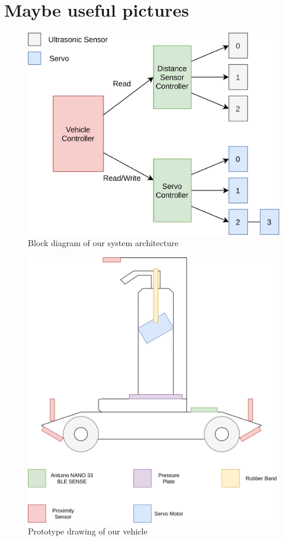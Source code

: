 \documentclass{article}
\begin{document}
\newpage
\section{Maybe useful pictures}


\begin{figure}[H]
	\centering
	\includegraphics[width=\linewidth]{system-architecture.png}
	\caption{Block diagram of our system architecture}
	\label{SystemArchBlock}
\end{figure}


\begin{figure}[H]
	\centering
	\includegraphics[width=\linewidth]{prototype-drawing.png}
	\caption{Prototype drawing of our vehicle}
	\label{ProtoDrawing}
\end{figure}
\end{document}
